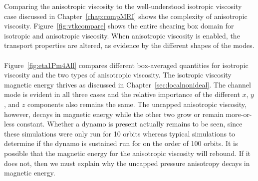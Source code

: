 %
%
%
Comparing the anisotropic viscosity to the well-understood isotropic viscosity case discussed in Chapter~\ref{chap:compMRI} shows the complexity of anisotropic viscosity. Figure~\ref{fig:vtkcompare} shows the entire shearing box domain for isotropic and anisotropic viscosity. When anisotropic viscosity is enabled, the transport properties are altered, as evidence by the different shapes of the modes.\\
\\
Figure~\ref{fig:eta1Pm4All} compares different box-averaged quantities for isotropic viscosity and the two types of anisotropic viscosity. The isotropic viscosity magnetic energy thrives as discussed in Chapter~\ref{sec:localnonideal}. The channel mode is evident in all three cases and the relative importance of the different $x$, $y$, and $z$ components also remains the same. The uncapped anisotropic viscosity, however, decays in magnetic energy while the other two grow or remain more-or-less constant. Whether a dynamo is present actually remains to be seen, since these simulations were only run for 10 orbits whereas typical simulations to determine if the dynamo is sustained run for on the order of 100 orbits. It is possible that the magnetic energy for the anisotropic viscosity will rebound. If it does not, then we must explain why the uncapped pressure anisotropy decays in magnetic energy.\\
\\

